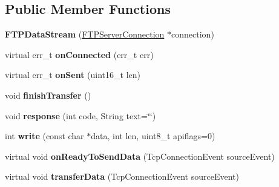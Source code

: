 \subsection*{Public Member Functions}
\begin{DoxyCompactItemize}
\item 
\hypertarget{class_f_t_p_data_stream_a2af1acb58e2cf042ac8fc07e8ccdc3a3}{}{\bfseries F\+T\+P\+Data\+Stream} (\hyperlink{class_f_t_p_server_connection}{F\+T\+P\+Server\+Connection} $\ast$connection)\label{class_f_t_p_data_stream_a2af1acb58e2cf042ac8fc07e8ccdc3a3}

\item 
\hypertarget{class_f_t_p_data_stream_aca2f90b7902043fcb71bc4d959732387}{}virtual err\+\_\+t {\bfseries on\+Connected} (err\+\_\+t err)\label{class_f_t_p_data_stream_aca2f90b7902043fcb71bc4d959732387}

\item 
\hypertarget{class_f_t_p_data_stream_a8a6ea4976b357a6307c4fba634a75db9}{}virtual err\+\_\+t {\bfseries on\+Sent} (uint16\+\_\+t len)\label{class_f_t_p_data_stream_a8a6ea4976b357a6307c4fba634a75db9}

\item 
\hypertarget{class_f_t_p_data_stream_a9cbc0ceadf3730c1164afed24d84f5f8}{}void {\bfseries finish\+Transfer} ()\label{class_f_t_p_data_stream_a9cbc0ceadf3730c1164afed24d84f5f8}

\item 
\hypertarget{class_f_t_p_data_stream_a73a91d01d206fc8ffc78228368b9d2ac}{}void {\bfseries response} (int code, String text=\char`\"{}\char`\"{})\label{class_f_t_p_data_stream_a73a91d01d206fc8ffc78228368b9d2ac}

\item 
\hypertarget{class_f_t_p_data_stream_a8da4f750cf0b17429e8d730cdd676c8e}{}int {\bfseries write} (const char $\ast$data, int len, uint8\+\_\+t apiflags=0)\label{class_f_t_p_data_stream_a8da4f750cf0b17429e8d730cdd676c8e}

\item 
\hypertarget{class_f_t_p_data_stream_a52fd64cf6ecd66115e52e790bdcf2dd7}{}virtual void {\bfseries on\+Ready\+To\+Send\+Data} (Tcp\+Connection\+Event source\+Event)\label{class_f_t_p_data_stream_a52fd64cf6ecd66115e52e790bdcf2dd7}

\item 
\hypertarget{class_f_t_p_data_stream_ac10b635d64be2b913bc8a3fbe6631271}{}virtual void {\bfseries transfer\+Data} (Tcp\+Connection\+Event source\+Event)\label{class_f_t_p_data_stream_ac10b635d64be2b913bc8a3fbe6631271}

\end{DoxyCompactItemize}
